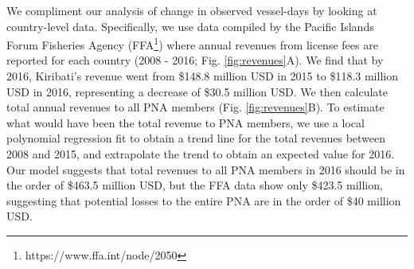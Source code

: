 \documentclass[9p,twocolumn,twoside,lineno]{pnas-new}
\begin{document}
We compliment our analysis of change in observed vessel-days by looking at country-level data. Specifically, we use data compiled by the Pacific Islands Forum Fisheries Agency (FFA\footnote{https://www.ffa.int/node/2050}) where annual revenues from license fees are reported for each country (2008 - 2016; Fig. \ref{fig:revenues}A). We find that by 2016, Kiribati's revenue went from \$148.8 million USD in 2015 to \$118.3 million USD in 2016, representing a decrease of \$30.5 million USD. We then calculate total annual revenues to all PNA members (Fig. \ref{fig:revenues}B). To estimate what would have been the total revenue to PNA members, we use a local polynomial regression fit to obtain a trend line for the total revenues between 2008 and 2015, and extrapolate the trend to obtain an expected value for 2016. Our model suggests that total revenues to all PNA members in 2016 should be in the order of \$463.5 million USD, but the FFA data show only \$423.5 million, suggesting that potential losses to the entire PNA are in the order of \$40 million USD.
\end{document}
